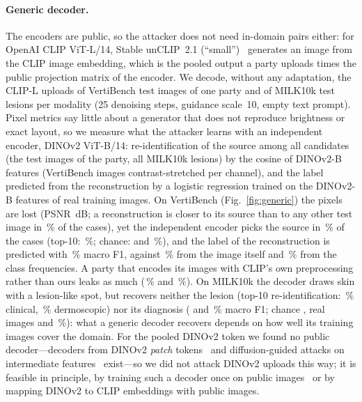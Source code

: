 \paragraph{Generic decoder.}
The encoders are public, so the attacker does not need in-domain pairs either: for OpenAI CLIP ViT-L/14, Stable unCLIP~2.1 (``small'')~\cite{ramesh2022unclip,rombach2022ldm} generates an image from the CLIP image embedding, which is the pooled output a party uploads times the public projection matrix of the encoder. We decode, without any adaptation, the CLIP-L uploads of \giVbN{} VertiBench test images of one party and of \giMilkN{} MILK10k test lesions per modality (25 denoising steps, guidance scale~10, empty text prompt). Pixel metrics say little about a generator that does not reproduce brightness or exact layout, so we measure what the attacker learns with an independent encoder, DINOv2 ViT-B/14: re-identification of the source among all candidates (the \giVbNTest{} test images of the party, all \giMilkNGal{} MILK10k lesions) by the cosine of DINOv2-B features (VertiBench images contrast-stretched per channel), and the label predicted from the reconstruction by a logistic regression trained on the DINOv2-B features of real training images. On VertiBench (Fig.~\ref{fig:generic}) the pixels are lost (PSNR \giVbPsnr\,dB; a reconstruction is closer to its source than to any other test image in \giVbPixReid\,\% of the cases), yet the independent encoder picks the source in \giVbReid\,\% of the cases (top-10: \giVbReidTen\,\%; chance: \giVbChance{} and \giVbChanceTen\,\%), and the label of the reconstruction is predicted with \giVbLabFone\,\% macro F1, against \giVbRealFone\,\% from the image itself and \giVbChanceFone\,\% from the class frequencies. A party that encodes its images with CLIP's own preprocessing rather than ours leaks as much (\giVbClipReid\,\% and \giVbClipLabFone\,\%). On MILK10k the decoder draws skin with a lesion-like spot, but recovers neither the lesion (top-10 re-identification: \giMilkClinReidTen\,\% clinical, \giMilkDermReidTen\,\% dermoscopic) nor its diagnosis (\giMilkClinLabFone{} and \giMilkDermLabFone\,\% macro F1; chance \giMilkChanceFone, real images \giMilkClinRealFone{} and \giMilkDermRealFone\,\%): what a generic decoder recovers depends on how well its training images cover the domain. For the pooled DINOv2 token we found no public decoder---decoders from DINOv2 \emph{patch} tokens~\cite{zheng2026rae} and diffusion-guided attacks on intermediate features~\cite{lei2025drag} exist---so we did not attack DINOv2 uploads this way; it is feasible in principle, by training such a decoder once on public images~\cite{bordes2022rcdm} or by mapping DINOv2 to CLIP embeddings with public images.

